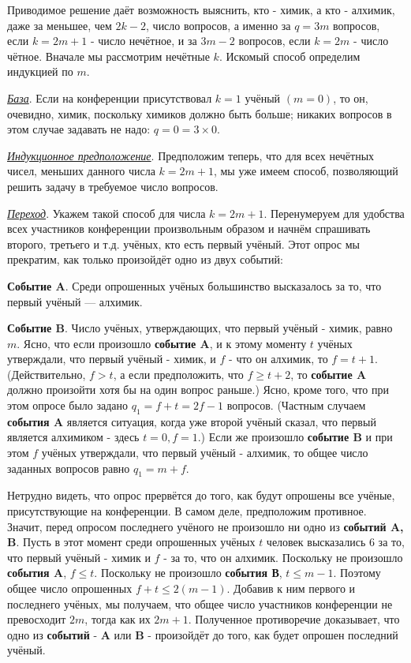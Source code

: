 \begin{prf}
    Приводимое решение даёт возможность выяснить, кто - химик, а кто - алхимик, даже за меньшее, чем $2k - 2$, число вопросов, а именно за $q = 3m$ вопросов, если $k = 2m + 1$ - число нечётное, и за $3m - 2$ вопросов, если $k = 2m$ - число чётное. Вначале мы рассмотрим нечётные $k$. Искомый способ определим индукцией по $m$. 
    \par
    \textit{\underline{База}}. Если на конференции присутствовал $k = 1$ учёный $(m = 0)$, то он, очевидно, химик, поскольку химиков должно быть больше; никаких вопросов в этом случае задавать не надо: $q = 0 = 3 \times 0$. 
    \par
    \textit{\underline{Индукционное предположение}}. Предположим теперь, что для всех нечётных чисел, меньших данного числа $k = 2m + 1$, мы уже имеем способ, позволяющий решить задачу в требуемое число вопросов.
    \par
    \textit{\underline{Переход}}. Укажем такой способ для числа $k = 2m + 1$. Перенумеруем для удобства всех участников конференции произвольным образом и начнём спрашивать второго, третьего и т.д. учёных, кто есть первый учёный. Этот опрос мы прекратим, как только произойдёт одно из двух событий:
    \par
    \textbf{Событие A}. Среди опрошенных учёных большинство высказалось за то, что первый учёный — алхимик. 
    \par
    \textbf{Событие B}. Число учёных, утверждающих, что первый учёный - химик, равно $m$. Ясно, что если произошло \textbf{событие A}, и к этому моменту $t$ учёных утверждали, что первый учёный - химик, и $f$ - что он алхимик, то $f = t + 1$. (Действительно, $f > t$, а если предположить, что $f \geq t + 2$, то \textbf{событие A} должно произойти хотя бы на один вопрос раньше.) Ясно, кроме того, что при этом опросе было задано $q_1 = f + t = 2f - 1$ вопросов. (Частным случаем \textbf{события A} является ситуация, когда уже второй учёный сказал, что первый является алхимиком - здесь $t = 0, f = 1$.) Если же произошло \textbf{событие B} и при этом $f$ учёных утверждали, что первый учёный - алхимик, то общее число заданных вопросов равно $q_1 = m + f$.
    \par 
    Нетрудно видеть, что опрос прервётся до того, как будут опрошены все учёные, присутствующие на конференции. В самом деле, предположим противное. Значит, перед опросом последнего учёного не произошло ни одно из \textbf{событий A, B}. Пусть в этот момент среди опрошенных учёных $t$ человек высказались 6 за то, что первый учёный - химик и $f$ - за то, что он алхимик. Поскольку не произошло \textbf{события A}, $f \leq t$. Поскольку не произошло \textbf{события В}, $t \leq m - 1$. Поэтому общее число опрошенных $f + t \leq 2(m - 1)$. Добавив к ним первого и последнего учёных, мы получаем, что общее число участников конференции не превосходит $2m$, тогда как их $2m + 1$. Полученное противоречие доказывает, что одно из \textbf{событий} - \textbf{A} или \textbf{B} - произойдёт до того, как будет опрошен последний учёный.

\end{prf}
